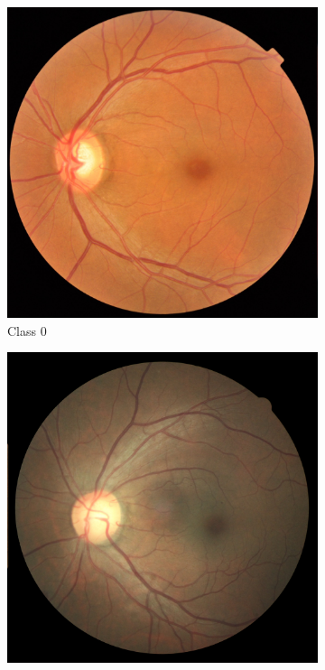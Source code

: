 \documentclass[sigconf,nonacm]{acmart}
\begin{document}
\begin{figure}[H]
\begin{subfigure}{0.18\linewidth}
\centering
\includegraphics[width=0.9\linewidth]{real-class0.png}
\caption{Class 0}
\end{subfigure}
\begin{subfigure}{0.18\linewidth}
\centering
\includegraphics[width=0.9\linewidth]{real-class1.png}

\end{subfigure}
\end{figure}
\end{document}
